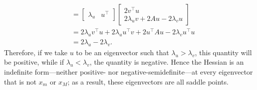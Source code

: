 \documentclass{letter}
\newcommand{\T}{\intercal}
\begin{document}
{\begin{align*}
        &= \begin{bmatrix} \lambda_u & u^\T \end{bmatrix} \begin{bmatrix} 2v^\T u \\ 2\lambda_u v + 2Au - 2\lambda_v u \end{bmatrix} \\
        &= 2\lambda_u v^\T u + 2\lambda_u u^\T v + 2u^\T A u - 2 \lambda_v u^\T u \\
        &= 2\lambda_u - 2\lambda_v.
    \end{align*} Therefore, if we take $u$ to be an eigenvector such that $\lambda_u > \lambda_v$, this quantity will be positive, while if $\lambda_u < \lambda_v$, the quantity is negative. Hence the Hessian is an indefinite form---neither positive- nor negative-semidefinite---at every eigenvector that is not $x_m$ or $x_M$; as a result, these eigenvectors are all saddle points.}
\end{document}
